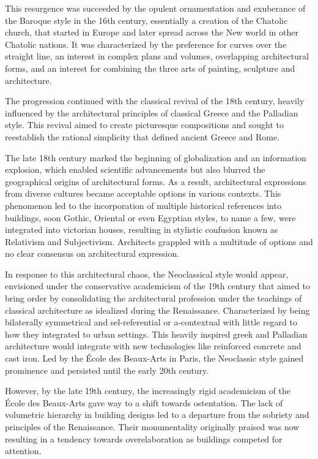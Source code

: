 This resurgence was succeeded by the opulent ornamentation and exuberance of the Baroque style in the 16th century, essentially a creation of the Chatolic church, that started in Europe and later spread across the New world in other Chatolic nations.
It was characterized by the preference for curves over the straight line, an interest in complex plans and volumes, overlapping architectural forms, and an interest for combining the three arts of painting, sculpture and architecture\cite{Economakis2023}.

The progression continued with the classical revival of the 18th century, heavily influenced by the architectural principles of classical Greece and the Palladian style.
This revival aimed to create picturesque compositions and sought to reestablish the rational simplicity that defined ancient Greece and Rome\cite{Economakis2023}.

The late 18th century marked the beginning of globalization and an information explosion, which enabled scientific advancements but also blurred the geographical origins of architectural forms.
As a result, architectural expressions from diverse cultures became acceptable options in various contexts.
This phenomenon led to the incorporation of multiple historical references into buildings, soon Gothic, Oriental or even Egyptian styles, to name a few, were integrated into victorian houses, resulting in stylistic confusion known as Relativism and Subjectivism.
Architects grappled with a multitude of options and no clear consensus on architectural expression\cite{Economakis2023}.

In response to this architectural chaos, the Neoclassical style would appear, envisioned under the conservative academicism of the 19th century that aimed to bring order by consolidating the architectural profession under the teachings of classical architecture as idealized during the Renaissance.
Characterized by being bilaterally symmetrical and sel-referential or a-contextual with little regard to how they integrated to urban settings.
This heavily inspired greek and Palladian architecture would integrate with new technologies like reinforced concrete and cast iron.
Led by the École des Beaux-Arts in Paris, the Neoclassic style gained prominence and persisted until the early 20th century\cite{Economakis2023}.

However, by the late 19th century, the increasingly rigid academicism of the École des Beaux-Arts gave way to a shift towards ostentation.
The lack of volumetric hierarchy in building designs led to a departure from the sobriety and principles of the Renaissance.
Their monumentality originally praised was now resulting in a tendency towards overelaboration as buildings competed for attention\cite{Economakis2023}.

